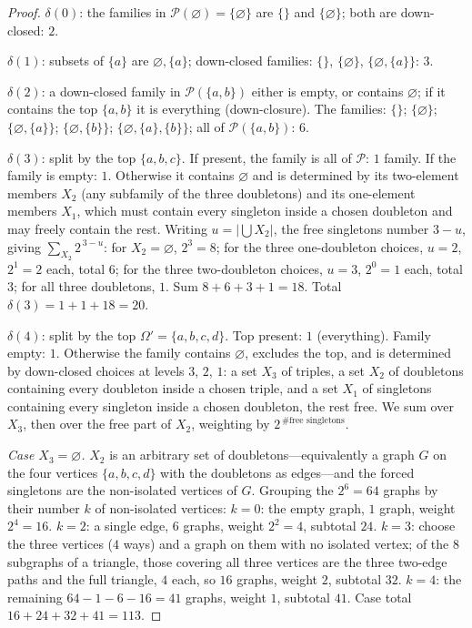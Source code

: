 \begin{proof}
$\delta(0)$: the families in $\mathcal{P}(\varnothing)=\{\varnothing\}$ are $\{\}$ and $\{\varnothing\}$; both are down-closed: $2$.

$\delta(1)$: subsets of $\{a\}$ are $\varnothing,\{a\}$; down-closed families: $\{\}$, $\{\varnothing\}$, $\{\varnothing,\{a\}\}$: $3$.

$\delta(2)$: a down-closed family in $\mathcal{P}(\{a,b\})$ either is empty, or contains $\varnothing$; if it contains the top $\{a,b\}$ it is everything (down-closure). The families: $\{\}$; $\{\varnothing\}$; $\{\varnothing,\{a\}\}$; $\{\varnothing,\{b\}\}$; $\{\varnothing,\{a\},\{b\}\}$; all of $\mathcal{P}(\{a,b\})$: $6$.

$\delta(3)$: split by the top $\{a,b,c\}$. If present, the family is all of $\mathcal{P}$: $1$ family. If the family is empty: $1$. Otherwise it contains $\varnothing$ and is determined by its two-element members $X_{2}$ (any subfamily of the three doubletons) and its one-element members $X_{1}$, which must contain every singleton inside a chosen doubleton and may freely contain the rest. Writing $u=|\bigcup X_{2}|$, the free singletons number $3-u$, giving $\sum_{X_{2}}2^{\,3-u}$: for $X_{2}=\varnothing$, $2^{3}=8$; for the three one-doubleton choices, $u=2$, $2^{1}=2$ each, total $6$; for the three two-doubleton choices, $u=3$, $2^{0}=1$ each, total $3$; for all three doubletons, $1$. Sum $8+6+3+1=18$. Total $\delta(3)=1+1+18=20$.

$\delta(4)$: split by the top $\Omega'=\{a,b,c,d\}$. Top present: $1$ (everything). Family empty: $1$. Otherwise the family contains $\varnothing$, excludes the top, and is determined by down-closed choices at levels $3$, $2$, $1$: a set $X_{3}$ of triples, a set $X_{2}$ of doubletons containing every doubleton inside a chosen triple, and a set $X_{1}$ of singletons containing every singleton inside a chosen doubleton, the rest free. We sum over $X_{3}$, then over the free part of $X_{2}$, weighting by $2^{\,\#\text{free singletons}}$.

\emph{Case $X_{3}=\varnothing$.} $X_{2}$ is an arbitrary set of doubletons---equivalently a graph $G$ on the four vertices $\{a,b,c,d\}$ with the doubletons as edges---and the forced singletons are the non-isolated vertices of $G$. Grouping the $2^{6}=64$ graphs by their number $k$ of non-isolated vertices: $k=0$: the empty graph, $1$ graph, weight $2^{4}=16$. $k=2$: a single edge, $6$ graphs, weight $2^{2}=4$, subtotal $24$. $k=3$: choose the three vertices ($4$ ways) and a graph on them with no isolated vertex; of the $8$ subgraphs of a triangle, those covering all three vertices are the three two-edge paths and the full triangle, $4$ each, so $16$ graphs, weight $2$, subtotal $32$. $k=4$: the remaining $64-1-6-16=41$ graphs, weight $1$, subtotal $41$. Case total $16+24+32+41=113$.


\end{proof}
